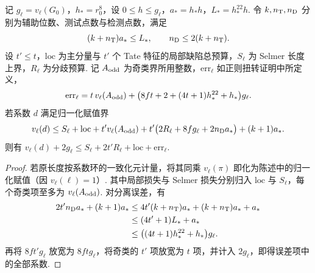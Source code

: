 \begin{lemma}
\label{lem:c-ribet-valuation-budget}
\emitthmsource
记 $g_\ell=v_\ell(G_0)$，$h_*=r_0^8$，设 $0\le h\le g_\ell$，$a_*=h_*h$，$L_*=h_*^{22}h$.
令 $k,n_{\rm T},n_{\rm D}$ 分别为辅助位数、测试点数与检测点数，满足
\[
 (k+n_{\rm T})a_*\le L_*,
 \qquad n_{\rm D}\le2(k+n_{\rm T}).
\]
设 $t'\le t$，$\mathrm{loc}$ 为主分量与 $t'$ 个 Tate 特征的局部缺陷总预算，$S_\ell$ 为 Selmer 长度上界，$R_\ell$ 为分歧预算.
记 $A_{\rm odd}$ 为奇类界所用整数，$\mathrm{err}_\ell$ 如正则扭转证明中所定义，
\[
 \mathrm{err}_\ell=t\,v_\ell(A_{\rm odd})+
   \bigl(8ft+2+(4t+1)h_*^{22}+h_*\bigr)g_\ell.
\]
若系数 $d$ 满足归一化赋值界
\[
 v_\ell(d)\le S_\ell+\mathrm{loc}
      +t'v_\ell(A_{\rm odd})
      +t'\bigl(2R_\ell+8f g_\ell+2n_{\rm D}a_*\bigr)
      +(k+1)a_* .
\]
则有 $v_\ell(d)+2g_\ell\le S_\ell+2t' R_\ell+\mathrm{loc}+\mathrm{err}_\ell$.
\end{lemma}
\begin{proof}
若原长度按系数环的一致化元计量，将其同乘 $v_\ell(\pi)$ 即化为陈述中的归一化赋值（因 $v_\ell(\ell)=1$）.
其中局部损失与 Selmer 损失分别归入 $\mathrm{loc}$ 与 $S_\ell$，每个奇类项至多为 $v_\ell(A_{\rm odd})$.
对分离误差，有
\[
 \begin{aligned}
 2t'n_{\rm D}a_*+(k+1)a_*
 &\le4t'(k+n_{\rm T})a_*+(k+n_{\rm T})a_*+a_*\\
 &\le(4t'+1)L_*+a_*\\
 &\le\bigl((4t+1)h_*^{22}+h_*\bigr)g_\ell .
 \end{aligned}
\]
再将 $8ft' g_\ell$ 放宽为 $8ft g_\ell$，将奇类的 $t'$ 项放宽为 $t$ 项，并计入 $2g_\ell$，即得误差项中的全部系数.
\end{proof}

